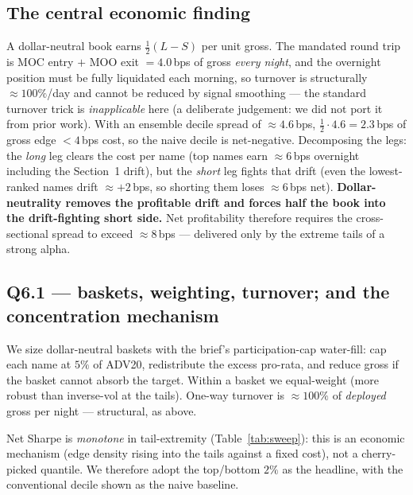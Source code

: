 \documentclass[11pt,a4paper]{article}
\newcommand{\spreadEns}{4.6}
\begin{document}
\subsection{The central economic finding}
A dollar-neutral book earns $\tfrac12(L-S)$ per unit gross. The mandated round trip is MOC entry $+$ MOO exit
$=4.0$\,bps of gross \emph{every night}, and the overnight position must be fully liquidated each morning, so
turnover is structurally $\approx100\%$/day and cannot be reduced by signal smoothing --- the standard
turnover trick is \emph{inapplicable} here (a deliberate judgement: we did not port it from prior work). With
an ensemble decile spread of $\approx\spreadEns$\,bps, $\tfrac12\cdot\spreadEns=2.3$\,bps of gross edge
$<4$\,bps cost, so the naive decile is net-negative. Decomposing the legs: the \emph{long} leg clears the cost
per name (top names earn $\approx6$\,bps overnight including the Section~1 drift), but the \emph{short} leg
fights that drift (even the lowest-ranked names drift $\approx+2$\,bps, so shorting them loses
$\approx6$\,bps net). \textbf{Dollar-neutrality removes the profitable drift and forces half the book into the
drift-fighting short side.} Net profitability therefore requires the cross-sectional spread to exceed
$\approx8$\,bps --- delivered only by the extreme tails of a strong alpha.

\subsection{Q6.1 --- baskets, weighting, turnover; and the concentration mechanism}
We size dollar-neutral baskets with the brief's participation-cap water-fill: cap each name at $5\%$ of ADV20,
redistribute the excess pro-rata, and reduce gross if the basket cannot absorb the target. Within a basket we
equal-weight (more robust than inverse-vol at the tails). One-way turnover is $\approx100\%$ of \emph{deployed}
gross per night --- structural, as above.

Net Sharpe is \emph{monotone} in tail-extremity (Table~\ref{tab:sweep}): this is an economic mechanism (edge
density rising into the tails against a fixed cost), not a cherry-picked quantile. We therefore adopt the
top/bottom $2\%$ as the headline, with the conventional decile shown as the naive baseline.
\end{document}
